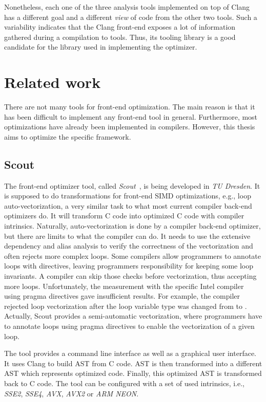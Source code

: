 Nonetheless, each one of the three analysis tools implemented on top of Clang has a different goal and a different \textit{view} of code from the other two tools. Such a variability indicates that the Clang front-end exposes a lot of information gathered during a compilation to tools. Thus, its tooling library is a good candidate for the library used in implementing the optimizer.

\section{Related work}
There are not many tools for front-end optimization. The main reason is that it has been difficult to implement any front-end tool in general. Furthermore, most optimizations have already been implemented in compilers. However, this thesis aims to optimize the specific framework.

\subsection{Scout}
\label{scout}
The front-end optimizer tool, called \emph{Scout}~\cite{scout}, is being developed in \emph{TU Dresden}. It is supposed to do transformations for front-end SIMD optimizations, e.g., loop auto-vectorization, a very similar task to what most current compiler back-end optimizers do. It will transform C code into optimized C code with compiler intrinsics. Naturally, auto-vectorization is done by a compiler back-end optimizer, but there are limits to what the compiler can do. It needs to use the extensive dependency and alias analysis to verify the correctness of the vectorization and often rejects more complex loops. Some compilers allow programmers to annotate loops with  directives,  leaving programmers responsibility for keeping some loop invariants. A compiler can skip those checks before vectorization, thus accepting more loops. Unfortunately, the measurement with the specific Intel compiler using pragma directives gave insufficient results. For example, the compiler rejected loop vectorization after the loop variable type was changed from  to . Actually, Scout provides a semi-automatic vectorization, where programmers have to annotate loops using pragma directives to enable the vectorization of a given loop.

The tool provides a command line interface as well as a graphical user interface. It uses Clang to build AST from C code. AST is then transformed into a different AST which represents optimized code. Finally, this optimized AST is transformed back to C code. The tool can be configured with a set of used intrinsics, i.e., \emph{SSE2}, \emph{SSE4}, \emph{AVX}, \emph{AVX2} or \emph{ARM NEON}.

